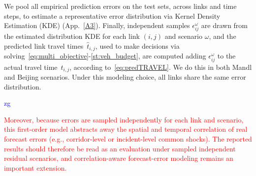 \documentclass[a4paper,fleqn]{cas-sc}
\newcommand{\stkout}[1]{\ifmmode\text{\sout{\ensuremath{#1}}}\else\sout{#1}\fi}
\newcommand\rev[3]{\textcolor{blue}{\begin{scriptsize}{#1}\end{scriptsize}\stkout{#2}}\textcolor{red}{#3}}
\newcommand\rev[3]{\ignorespaces#3\ignorespaces\unskip}
\begin{document}
We pool all empirical prediction errors on the test sets, across links and time steps, to estimate a representative error distribution via Kernel Density Estimation (KDE) (App.~\ref{A3}). Finally, independent samples $\epsilon_{ij}^{\omega}$ are drawn from the estimated distribution KDE for each link $(i,j)$ and scenario $\omega$, and the predicted link travel times~$\hat t_{i,j}$, used to make decisions via solving~\eqref{eq:multi_objective}-\eqref{st:veh_budget}, are computed adding $\epsilon_{ij}^{\omega}$ to the actual travel time~$t_{i,j}$, according to~\eqref{eq:predTRAVEL}. We do this in both Mandl and Beijing scenarios.
Under this modeling choice, all links share the same error distribution.\rev{zg}{}{ Moreover, because errors are sampled independently for each link and scenario, this first-order model abstracts away the spatial and temporal correlation of real forecast errors (e.g., corridor-level or incident-level common shocks). The reported results should therefore be read as an evaluation under sampled independent residual scenarios, and correlation-aware forecast-error modeling remains an important extension.}

\end{document}
